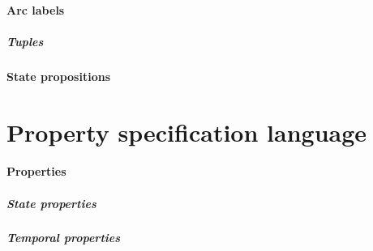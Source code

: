 \paragraph{Arc labels\\}\arclabeldef
\subparagraph{Tuples\\}\tupledef

\paragraph{State propositions\\}\statepropositiondef

\section{Property specification language}

\paragraph{Properties\\}\propertyspecificationdef
\subparagraph{State properties\\}\statepropertydef
\subparagraph{Temporal properties\\}\temporalpropertydef

